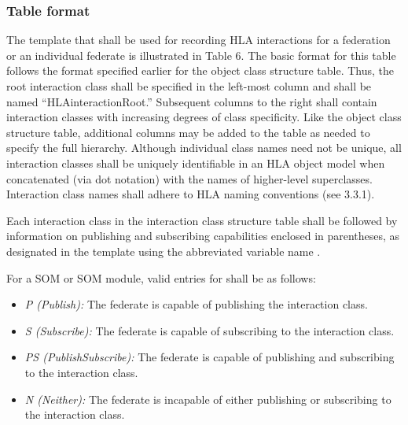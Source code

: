 \subsubsection{Table format}
The template that shall be used for recording HLA interactions for a federation or an individual federate is illustrated in Table 6. The basic format for this table follows the format specified earlier for the object class structure table. Thus, the root interaction class shall be specified in the left-most column and shall be named ``HLAinteractionRoot.'' Subsequent columns to the right shall contain interaction classes with increasing degrees of class specificity. Like the object class structure table, additional columns may be added to the table as needed to specify the full hierarchy. Although individual class names need not be unique, all interaction classes shall be uniquely identifiable in an HLA object model when concatenated (via dot notation) with the names of higher-level superclasses. Interaction class names shall adhere to HLA naming conventions (see 3.3.1).

\vspace{-4pt}

\newpage
Each interaction class in the interaction class structure table shall be followed by information on publishing and subscribing capabilities enclosed in parentheses, as designated in the template using the abbreviated variable name .

For a SOM or SOM module, valid entries for  shall be as follows:
\begin{itemize}[leftmargin=32pt,labelwidth=10pt,labelsep=12pt,itemsep=2pt,topsep=2pt]
\item \textit{P (Publish):} The federate is capable of publishing the interaction class.
\item \textit{S (Subscribe):} The federate is capable of subscribing to the interaction class.
\item \textit{PS (PublishSubscribe):} The federate is capable of publishing and subscribing to the interaction class.
\item \textit{N (Neither):} The federate is incapable of either publishing or subscribing to the interaction class.
\end{itemize}

